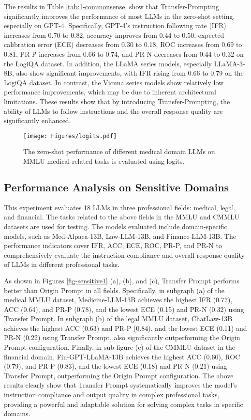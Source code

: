 The results in Table \ref{tab:1-commonsense} show that Transfer-Prompting significantly improves the performance of most LLMs in the zero-shot setting, especially on GPT-4. Specifically, GPT-4’s instruction following rate (IFR) increases from 0.70 to 0.82, accuracy improves from 0.44 to 0.50, expected calibration error (ECE) decreases from 0.30 to 0.18, ROC increases from 0.69 to 0.81, PR-P increases from 0.66 to 0.74, and PR-N decreases from 0.44 to 0.32 on the LogiQA dataset. In addition, the LLaMA series models, especially LLaMA-3-8B, also show significant improvements, with IFR rising from 0.66 to 0.79 on the LogiQA dataset. In contrast, the Vicuna series models show relatively low performance improvements, which may be due to inherent architectural limitations. These results show that by introducing Transfer-Prompting, the ability of LLMs to follow instructions and the overall response quality are significantly enhanced.



\begin{figure*}[!h]
\centering
\texttt{[image: Figures/logits.pdf]}
\hfill
\caption{The zero-shot performance of different medical domain LLMs on MMLU medical-related tasks is evaluated using logits.}
\label{fig: logits-zero}
\end{figure*}


\subsection{Performance Analysis on Sensitive Domains}

This experiment evaluates 18 LLMs in three professional fields: medical, legal, and financial. The tasks related to the above fields in the MMLU and CMMLU datasets are used for testing. The models evaluated include domain-specific models, such as Med-Alpaca-13B, Law-LLM-13B, and Finance-LLM-13B. The performance indicators cover IFR, ACC, ECE, ROC, PR-P, and PR-N to comprehensively evaluate the instruction compliance and overall response quality of LLMs in different professional tasks.

As shown in Figures \ref{fig-sensitive1} (a), (b), and (c), Transfer Prompt performs better than Origin Prompt in all fields. Specifically, in subgraph (a) of the medical MMLU dataset, Medicine-LLM-13B achieves the highest IFR (0.77), ACC (0.64), and PR-P (0.78), and the lowest ECE (0.15) and PR-N (0.32) using Transfer Prompt. In subgraph (b) of the legal MMLU dataset, ChatLaw-13B achieves the highest ACC (0.63) and PR-P (0.84), and the lowest ECE (0.11) and PR-N (0.22) using Transfer Prompt, also significantly outperforming the Origin Prompt configuration. Finally, in sub-figure (c) of the CMMLU dataset in the financial domain, Fin-GPT-LLaMA-13B achieves the highest ACC (0.60), ROC (0.79), and PR-P (0.83), and the lowest ECE (0.18) and PR-N (0.21) using Transfer Prompt, outperforming the Origin Prompt configuration.
The above results clearly show that Transfer Prompt systematically improves the model's instruction compliance and output quality in complex professional tasks, providing a powerful and adaptable solution for solving complex tasks in specific domains.


